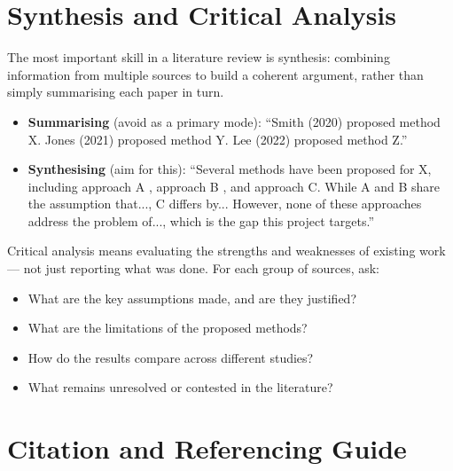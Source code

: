 \section{Synthesis and Critical Analysis}
\label{sec:lit_synthesis}

The most important skill in a literature review is synthesis: combining 
information from multiple sources to build a coherent argument, rather than 
simply summarising each paper in turn. 

\begin{itemize}
    \item \textbf{Summarising} (avoid as a primary mode): ``Smith (2020) proposed 
    method X. Jones (2021) proposed method Y. Lee (2022) proposed method Z.''

    \item \textbf{Synthesising} (aim for this): ``Several methods have been 
    proposed for X, including approach A \citep{lamport1994latex}, approach B 
    \citep{kottwitzlatex2021}, and approach C. While A and B share the assumption 
    that..., C differs by... However, none of these approaches address the problem 
    of..., which is the gap this project targets.''
\end{itemize}

\noindent Critical analysis means evaluating the strengths and weaknesses of 
existing work — not just reporting what was done. For each group of sources, ask:
\begin{itemize}
    \item What are the key assumptions made, and are they justified?
    \item What are the limitations of the proposed methods?
    \item How do the results compare across different studies?
    \item What remains unresolved or contested in the literature?
\end{itemize}

\section{Citation and Referencing Guide}
\label{sec:lit_citation}

